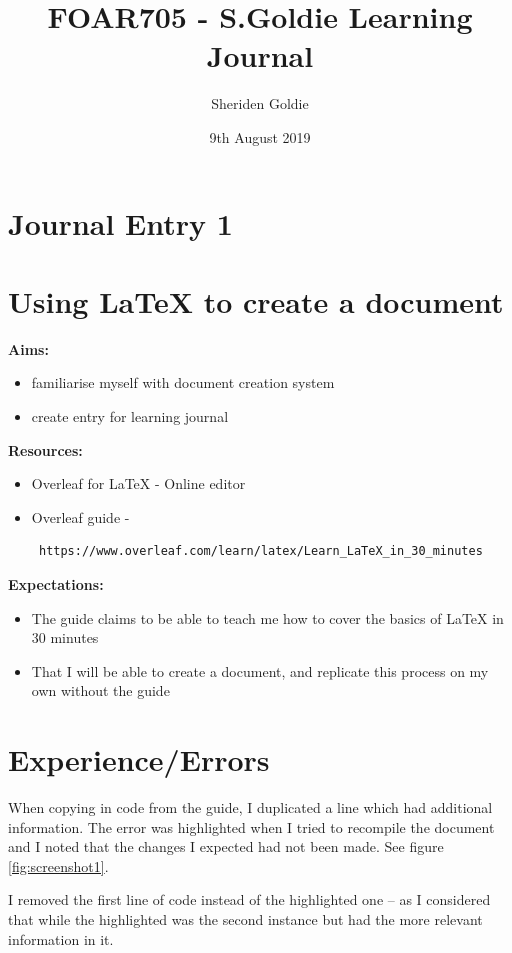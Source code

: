 \documentclass{article}
\title{FOAR705 - S.Goldie Learning Journal}
\author{Sheriden Goldie}
\date{9th August 2019}
\begin{document}
\maketitle
\section*{Journal Entry 1}
\section*{Using LaTeX to create a document}

\textbf{Aims:}
\begin{itemize}
    \item familiarise myself with document creation system
    \item create entry for learning journal
    \end{itemize}

\noindent \textbf{Resources:}
\begin{itemize}
    \item Overleaf for LaTeX - Online editor
    \item Overleaf guide - \begin{verbatim} https://www.overleaf.com/learn/latex/Learn_LaTeX_in_30_minutes \end{verbatim}
    \end{itemize}

\noindent \textbf{Expectations:}
\begin{itemize}
    \item The guide claims to be able to teach me how to cover the basics of LaTeX in 30 minutes
    \item That I will be able to create a document, and replicate this process on my own without the guide
\end{itemize}


\section*{Experience/Errors}

When copying in code from the guide, I duplicated a line which had additional information. The error was highlighted when I tried to recompile the document and I noted that the changes I expected had not been made.
See figure \ref{fig:screenshot1}.

I removed the first line of code instead of the highlighted one – as I considered that while the highlighted was the second instance but had the more relevant information in it.
\end{document}
